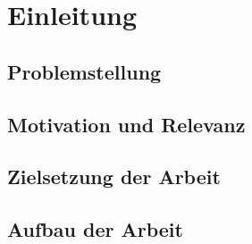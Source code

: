 \chapter{Einleitung}
\label{chap:einleitung}

\section{Problemstellung}

\section{Motivation und Relevanz}

\section{Zielsetzung der Arbeit}

\section{Aufbau der Arbeit}